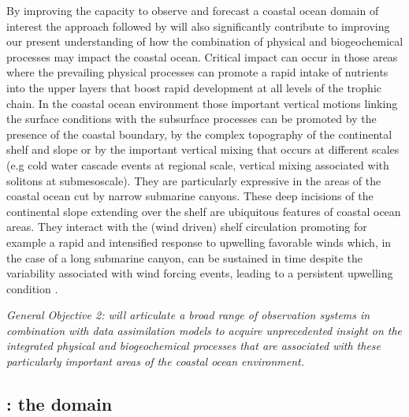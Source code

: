 By improving the capacity to observe and forecast a coastal ocean
domain of interest the approach followed by \proj will also
significantly contribute to improving our present understanding of how
the combination of physical and biogeochemical processes may impact
the coastal ocean. Critical impact can occur in those areas where the
prevailing physical processes can promote a rapid intake of nutrients
into the upper layers that boost rapid development at all levels of
the trophic chain. In the coastal ocean environment those important
vertical motions linking the surface conditions with the subsurface
processes can be promoted by the presence of the coastal boundary, by
the complex topography of the continental shelf and slope or by the
important vertical mixing that occurs at different scales (e.g cold
water cascade events at regional scale, vertical mixing associated
with solitons at submesoscale). They are particularly expressive in
the areas of the coastal ocean cut by narrow submarine canyons. These
deep incisions of the continental slope extending over the shelf are
ubiquitous features of coastal ocean areas.  They interact with the
(wind driven) shelf circulation promoting for example a rapid and
intensified response to upwelling favorable winds \cite{she00} which,
in the case of a long submarine canyon, can be sustained in time
despite the variability associated with wind forcing events, leading
to a persistent upwelling condition \cite{allen00}.

\emph{General Objective 2: \proj will articulate a broad range of
  observation systems in combination with data assimilation models to
  acquire unprecedented insight on the integrated physical and
  biogeochemical processes that are associated with these particularly
  important areas of the coastal ocean environment.}

\subsection{\naze: the domain}
\label{sec:naz}

